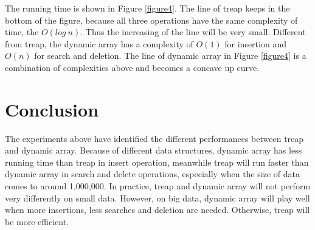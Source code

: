 \documentclass[11pt]{article}
\begin{document}
The running time is shown in Figure \ref{figure4}.
The line of treap keeps in the bottom of the figure, because all three operations have the same complexity of time, the $O(log\ n)$.
Thus the increasing of the line will be very small.
Different from treap, the dynamic array has a complexity of $O(1)$ for insertion and $O(n)$ for search and deletion.
The line of dynamic array in Figure \ref{figure4} is a combination of complexities above and becomes a concave up curve.

\section{Conclusion}
The experiments above have identified the different performances between treap and dynamic array.
Because of different data structures, dynamic array has less running time than treap in insert operation, 
meanwhile treap will run faster than dynamic array in search and delete operations, especially when the size of data comes to around 1,000,000.
In practice, treap and dynamic array will not perform very differently on small data.
However, on big data, dynamic array will play well when more insertions, less searches and deletion are needed.
Otherwise, treap will be more efficient.

\nocite{*}

% 
\end{document}
